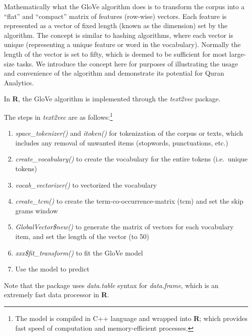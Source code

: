\documentclass[
]{article}
\providecommand{\tightlist}{%
  \setlength{\itemsep}{0pt}\setlength{\parskip}{0pt}}
\begin{document}
Mathematically what the GloVe algorithm does is to transform the corpus into a ``flat'' and ``compact'' matrix of features (row-wise) vectors. Each feature is represented as a vector of fixed length (known as the dimension) set by the algorithm. The concept is similar to hashing algorithms, where each vector is unique (representing a unique feature or word in the vocabulary). Normally the length of the vector is set to fifty, which is deemed to be sufficient for most large-size tasks. We introduce the concept here for purposes of illustrating the usage and convenience of the algorithm and demonstrate its potential for Quran Analytics.

In \textbf{R}, the GloVe algorithm is implemented through the \emph{text2vec} \citep{text2vec} package.

The steps in \emph{text2vec} are as follows:\footnote{The model is compiled in C++ language and wrapped into \textbf{R}; which provides fast speed of computation and memory-efficient processes.}

\begin{enumerate}
\def\labelenumi{\arabic{enumi}.}
\tightlist
\item
  \emph{space\_tokenizer()} and \emph{itoken()} for tokenization of the corpus or texts, which includes any removal of unwanted items (stopwords, punctuations, etc.)
\item
  \emph{create\_vocabulary()} to create the vocabulary for the entire tokens (i.e.~unique tokens)
\item
  \emph{vocab\_vectorizer()} to vectorized the vocabulary
\item
  \emph{create\_tcm()} to create the term-co-occurrence-matrix (tcm) and set the skip grams window
\item
  \emph{GlobalVector\$new()} to generate the matrix of vectors for each vocabulary item, and set the length of the vector (to 50)
\item
  \emph{xxx\$fit\_transform()} to fit the GloVe model
\item
  Use the model to predict
\end{enumerate}

Note that the package uses \emph{data.table} syntax for \emph{data.frame}, which is an extremely fast data processor in \textbf{R}.

\footnotesize
\end{document}
